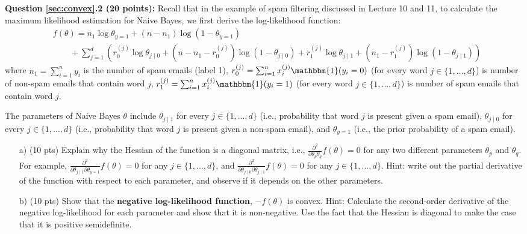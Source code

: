 \documentclass[12pt]{article}
\begin{document}
\textbf{Question \ref{sec:convex}.2 (20 points):} Recall that in the example of spam filtering discussed in Lecture 10 and 11, to calculate the maximum likelihood estimation for Naive Bayes, we first derive the log-likelihood function:
    \begin{align*}
        &f(\theta) = n_1 \log\theta_{y=1}+(n-n_1)\log(1-\theta_{y=1})\\
        &\qquad+ \sum_{j=1}^{d}\left( r_0^{(j)}\log\theta_{j \mid 0}+(n-n_1-r_0^{(j)})\log(1-\theta_{j \mid 0})+r_1^{(j)} \log\theta_{j \mid 1}+(n_1-r_1^{(j)})\log(1-\theta_{j \mid 1})\right)
    \end{align*}
where $n_1 = \sum_{i=1}^n y_i$ is the number of spam emails (label 1), $r_0^{(j)}=\sum_{i=1}^n x_i^{(j)} \mathbbm{1}(y_i=0)$ (for every word $j\in\{1,...,d\}$) is  number of non-spam emails that contain word $j$, $r_1^{(j)}=\sum_{i=1}^n x_i^{(j)} \mathbbm{1}(y_i=1)$ (for every word $j\in\{1,...,d\}$) is  number of spam emails that contain word $j$. 

The parameters of Naive Bayes $\theta$ include $\theta_{j \mid 1}$ for every $j\in\{1,...,d\}$ (i.e., probability that word $j$ is present given a spam email), $\theta_{j \mid 0}$ for every $j\in\{1,...,d\}$ (i.e., probability that word $j$ is present given a non-spam email), and $\theta_{y=1}$ (i.e., the prior probability of a spam email).


\begin{enumerate}
    \item[a)] (10 pts) Explain why the Hessian of the function is a diagonal matrix, i.e., $\frac{\partial^2}{\partial \theta_p\theta_q}f(\theta)=0$ for any two different parameters $\theta_p$ and $\theta_q$. For example, $\frac{\partial^2}{\partial \theta_{j \mid 1}\partial\theta_{y=1}}f(\theta)=0$ for any $j\in\{1,...,d\}$, and $\frac{\partial^2}{\partial \theta_{j \mid 0}\partial\theta_{j \mid 1}}f(\theta)=0$ for any $j\in\{1,...,d\}$. Hint: write out the partial derivative of the function with respect to each parameter, and observe if it depends on the other parameters.
    \item[b)] (10 pts) Show that the \textbf{negative log-likelihood function}, $-f(\theta)$ is convex. Hint: Calculate the second-order derivative of the negative log-likelihood for each parameter and show that it is non-negative. Use the fact that the Hessian is diagonal to make the case that it is positive semidefinite.
\end{enumerate} 
\end{document}
